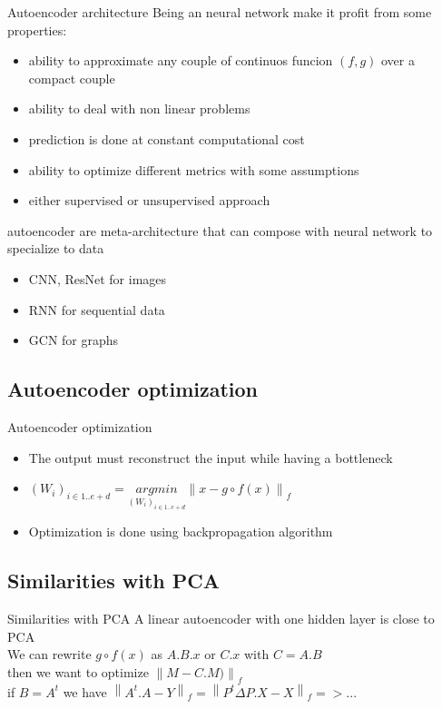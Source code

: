 \documentclass{beamer}
\newcommand{\norm}[1]{\left\lVert#1\right\rVert}
\begin{document}
\begin{frame}{Autoencoder architecture}
	Being an neural network make it profit from some properties:
	\begin{itemize}
		\item ability to approximate any couple of continuos funcion $(f,g)$ over a compact couple
		\item ability to deal with non linear problems
		\item prediction is done at constant computational cost
		\item ability to optimize different metrics with some assumptions
		\item either supervised or unsupervised approach
	\end{itemize}
	autoencoder are meta-architecture that can compose with neural network to specialize to data
	\begin{itemize}
		\item CNN, ResNet for images 
		\item RNN for sequential data
		\item GCN for graphs
	\end{itemize}
\end{frame}

\subsection{Autoencoder optimization}
\begin{frame}{Autoencoder optimization}
	\begin{itemize}
		\item The output must reconstruct the input while having a bottleneck
		\item $(W_i)_{i \in {1 .. e+d}} = \underset{(W_i)_{i \in {1 .. e+d}}}{argmin} \norm{ x - g \circ f(x)}_f$
		\item Optimization is done using backpropagation algorithm
	\end{itemize}
\end{frame}

\subsection{Similarities with PCA}
\begin{frame}{Similarities with PCA}
	A linear autoencoder with one hidden layer is close to PCA\\
	We can rewrite $g \circ f (x)$ as $A.B.x$ or $C.x$ with $C = A.B$\\
	then we want to optimize $\norm{ M - C.M)}_f$ \\ 
	if $B = A^{t}$ we have $\norm{A^{t}.A - Y}_f = \norm{ P^t \Delta P. X - X}_f => ... $
\end{frame}
\end{document}
